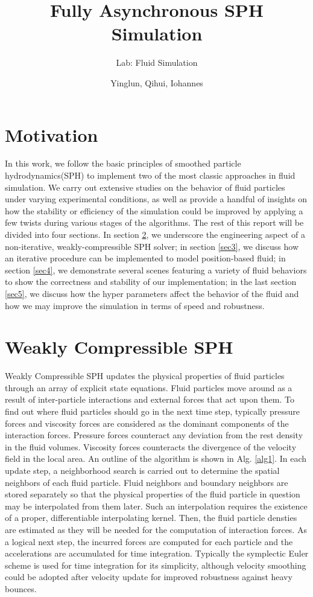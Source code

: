 \documentclass[
	11pt, 
	DIV10,
	ngerman,
	a4paper, 
	oneside, 
	headings=normal, 
	captions=tableheading,
	final, 
	numbers=noenddot
]{scrartcl}
\title{Fully Asynchronous SPH Simulation}
\subtitle{\vspace{0.5cm}Lab: Fluid Simulation}
\author{Yinglun, Qihui, Iohannes}
\begin{document}
\maketitle


\section{Motivation}

In this work, we follow the basic principles of smoothed particle hydrodynamics(SPH) to implement two of the most classic approaches in fluid simulation. We carry out extensive studies on the behavior of fluid particles under varying experimental conditions, as well as provide a handful of insights on how the stability or efficiency of the simulation could be improved by applying a few twists during various stages of the algorithms. The rest of this report will be divided into four sections. In section \ref{sec2}, we underscore the engineering aspect of a non-iterative, weakly-compressible SPH solver; in section \ref{sec3}, we discuss how an iterative procedure can be implemented to model position-based fluid; in section \ref{sec4}, we demonstrate several scenes featuring a variety of fluid behaviors to show the correctness and stability of our implementation; in the last section \ref{sec5}, we discuss how the hyper parameters affect the behavior of the fluid and how we may improve the simulation in terms of speed and robustness.


\section{Weakly Compressible SPH}
\label{sec2}

Weakly Compressible SPH updates the physical properties of fluid particles through an array of explicit state equations. Fluid particles move around as a result of inter-particle interactions and external forces that act upon them. To find out where fluid particles should go in the next time step, typically pressure forces and viscosity forces are considered as the dominant components of the interaction forces. Pressure forces counteract any deviation from the rest density in the fluid volumes. Viscosity forces counteracts the divergence of the velocity field in the local area. An outline of the algorithm is shown in Alg. \ref{alg1}. In each update step, a neighborhood search is carried out to determine the spatial neighbors of each fluid particle. Fluid neighbors and boundary neighbors are stored separately so that the physical properties of the fluid particle in question may be interpolated from them later. Such an interpolation requires the existence of a proper, differentiable interpolating kernel. Then, the fluid particle densties are estimated as they will be needed for the computation of interaction forces. As a logical next step, the incurred forces are computed for each particle and the accelerations are accumulated for time integration. Typically the symplectic Euler scheme is used for time integration for its simplicity, although velocity smoothing could be adopted after velocity update for improved robustness against heavy bounces.
\end{document}
